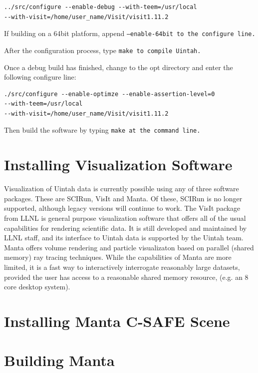 \documentclass[12pt]{report}
\begin{document}
\begin{Verbatim}[fontsize=\footnotesize]
../src/configure --enable-debug --with-teem=/usr/local
--with-visit=/home/user_name/Visit/visit1.11.2
\end{Verbatim}

If building on a 64bit platform, append \tt --enable-64bit \normalfont
to the configure line.

After the configuration process, type \tt make \normalfont to compile
Uintah.

Once a debug build has finished, change to the opt directory and enter
the following configure line:

\begin{Verbatim}[fontsize=\footnotesize]
./src/configure --enable-optimze --enable-assertion-level=0 
--with-teem=/usr/local
--with-visit=/home/user_name/Visit/visit1.11.2
\end{Verbatim}

Then build the software by typing \tt make \normalfont at the command line.

\section{Installing Visualization Software}

Visualization of Uintah data is currently possible using any of three
software packages.  These are SCIRun, VisIt and Manta.  Of these, SCIRun is
no longer supported, although legacy versions will continue to work.  The
VisIt package from LLNL is general purpose visualization software that offers
all of the usual capabilities for rendering scientific data.  It is still
developed and maintained by LLNL staff, and its interface to Uintah data is
supported by the Uintah team.  Manta offers volume rendering and particle
visualizaton based on parallel (shared memory) ray tracing techniques.
While the capabilities of Manta are more limited, it is a fast way to
interactively interrogate reasonably large datasets, provided the user has
access to a reasonable shared memory resource, (e.g. an 8 core desktop system).

\section{Installing Manta C-SAFE Scene}

\section{Building Manta}
\end{document}
